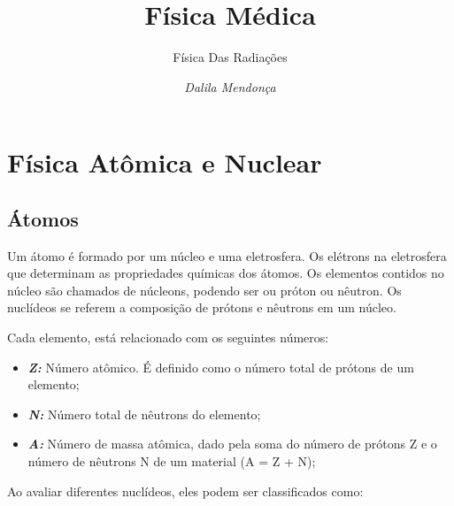\documentclass[11pt,a4paper]{article}
\title{Física Médica}
\author{Física Das Radiações\nocite{*}}
\date{\textit{Dalila Mendonça}}
\begin{document}
	\maketitle


    \section{Física Atômica e Nuclear}

        \subsection{Átomos}

            Um átomo é formado por um núcleo e uma eletrosfera. Os elétrons na eletrosfera que determinam as propriedades químicas dos átomos. Os elementos contidos no núcleo são chamados de núcleons, podendo ser ou próton ou nêutron. Os nuclídeos se referem a composição de prótons e nêutrons em um núcleo.

            Cada elemento, está relacionado com os seguintes números:

            \begin{itemize}
                \item \textbf{\textit{\textcolor{CarnationPink}{Z:}}} Número atômico. É definido como o número total de prótons de um elemento;
                \item \textbf{\textit{\textcolor{CarnationPink}{N:}}} Número total de nêutrons do elemento;
                \item \textbf{\textit{\textcolor{CarnationPink}{A:}}} Número de massa atômica, dado pela soma do número de prótons Z e o número de nêutrons N de um material (A = Z + N);
            \end{itemize}
            
            Ao avaliar diferentes nuclídeos, eles podem ser classificados como:
\end{document}
